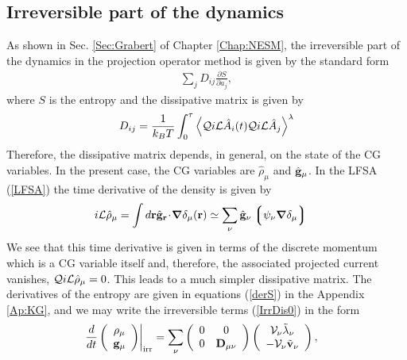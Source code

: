 \documentclass[b5paper,openright,10pt]{book}
\newcommand{\esc}{\!\cdot\!}
\newcommand{\llangle}{\left\langle}
\newcommand{\rrangle}{\right\rangle}
\newcommand{\llg}{\left\lgroup}
\newcommand{\rlg}{\right\rgroup}
\begin{document}
\subsection{Irreversible part of the dynamics}
As shown in  Sec. \ref{Sec:Grabert} of Chapter  \ref{Chap:NESM}, the  irreversible part of the
dynamics in  the projection operator  method is given by  the standard
form
\begin{align}
  \sum_jD_{ij}\frac{\partial S}{\partial a_j},
\label{IrrDis0}
\end{align}
where $S$ is the entropy and the dissipative matrix is given by
\begin{align}
  D_{ij}=\frac{1}{k_BT}\int_0^\tau\llangle {\cal Q}i{\cal L}\hat{A}_i(t){\cal Q}i{\cal L}\hat{A}_j\rrangle^{\lambda}
\end{align}
Therefore,  the dissipative  matrix  depends,  in
general, on the state of the CG variables.  In the present case, the CG
variables are $\hat{\rho}_\mu$ and $\hat{\bf g}_\mu$.   In the
LFSA (\ref{LFSA}) the time derivative of the density is given by
\begin{align}
  i{\cal L}\hat{\rho}_\mu &=\int d{\bf r}\hat{\bf g}_{\bf r} \esc\boldsymbol{\nabla}\delta_\mu({\bf r})
\simeq \sum_\nu\hat{\bf g}_\nu \llg\psi_\nu\boldsymbol{\nabla}\delta_\mu\rlg
\end{align}
We see  that this time  derivative is given  in terms of  the discrete
momentum which is a CG  variable itself and, therefore, the associated
projected  current vanishes,  ${\cal Q}i{\cal  L}\hat{\rho}_\mu =0$.
This leads to a much simpler dissipative matrix.
The derivatives of the entropy are  given in equations  (\ref{derS}) in the
Appendix \ref{Ap:KG}, and we  may write the irreversible  terms (\ref{IrrDis0}) in
the form
\begin{align}
\left.\frac{d}{dt}\left(\begin{array}{c}
\rho_\mu\\
{\bf g}_\mu
\end{array}\right)\right|_{\rm irr}
&=\sum_\nu\left(\begin{array}{cc}
0&0\\
0&{\bf D}_{\mu\nu}
\end{array}\right)\left(
\begin{array}{c}
{\cal V}_\nu \tilde{\lambda}_\nu\\
-{\cal V}_\nu \tilde{\bf v}_\nu
\end{array}\right), 
\label{IrrDis}
\end{align}
\end{document}
